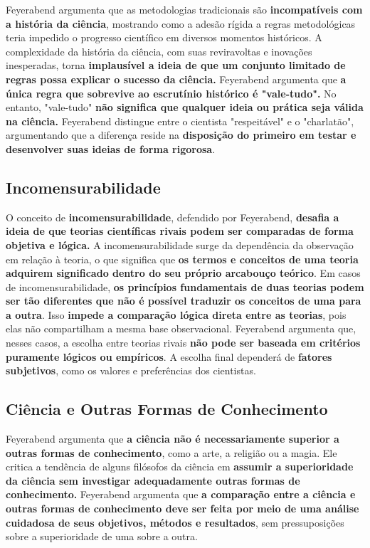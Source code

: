\documentclass{article} %
\begin{document}
Feyerabend argumenta que as metodologias tradicionais são \textbf{incompatíveis com a história da ciência}, mostrando como a adesão rígida a regras metodológicas teria impedido o progresso científico em diversos momentos históricos. A complexidade da história da ciência, com suas reviravoltas e inovações inesperadas, torna \textbf{implausível a ideia de que um conjunto limitado de regras possa explicar o sucesso da ciência.} Feyerabend argumenta que \textbf{a única regra que sobrevive ao escrutínio histórico é "vale-tudo".} No entanto, "vale-tudo" \textbf{não significa que qualquer ideia ou prática seja válida na ciência.} Feyerabend distingue entre o cientista "respeitável" e o "charlatão", argumentando que a diferença reside na \textbf{disposição do primeiro em testar e desenvolver suas ideias de forma rigorosa}.

\subsection{Incomensurabilidade}

O conceito de \textbf{incomensurabilidade}, defendido por Feyerabend, \textbf{desafia a ideia de que teorias científicas rivais podem ser comparadas de forma objetiva e lógica.} A incomensurabilidade surge da dependência da observação em relação à teoria, o que significa que \textbf{os termos e conceitos de uma teoria adquirem significado dentro do seu próprio arcabouço teórico}. Em casos de incomensurabilidade, \textbf{os princípios fundamentais de duas teorias podem ser tão diferentes que não é possível traduzir os conceitos de uma para a outra}. Isso \textbf{impede a comparação lógica direta entre as teorias}, pois elas não compartilham a mesma base observacional. Feyerabend argumenta que, nesses casos, a escolha entre teorias rivais \textbf{não pode ser baseada em critérios puramente lógicos ou empíricos}. A escolha final dependerá de \textbf{fatores subjetivos}, como os valores e preferências dos cientistas.

\subsection{Ciência e Outras Formas de Conhecimento}

Feyerabend argumenta que \textbf{a ciência não é necessariamente superior a outras formas de conhecimento}, como a arte, a religião ou a magia. Ele critica a tendência de alguns filósofos da ciência em \textbf{assumir a superioridade da ciência sem investigar adequadamente outras formas de conhecimento.} Feyerabend argumenta que \textbf{a comparação entre a ciência e outras formas de conhecimento deve ser feita por meio de uma análise cuidadosa de seus objetivos, métodos e resultados}, sem pressuposições sobre a superioridade de uma sobre a outra.
\end{document}
